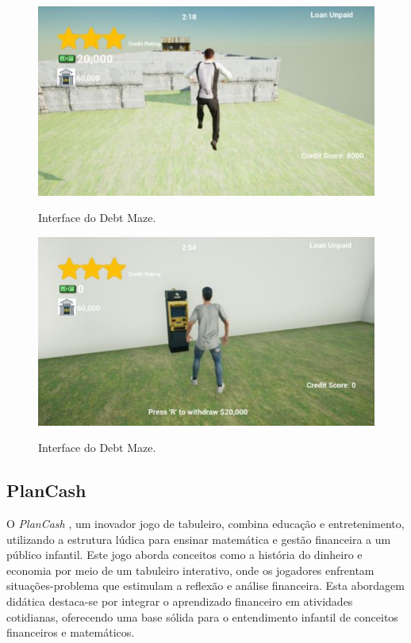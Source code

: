 \begin{figure}[ht]
	\centering
	\caption{Interface do Debt Maze.}
	\includegraphics[scale=0.9]{Textuais/Pictures/debt-maze-1.png}
	\label{fig:debt-maze-1}
\end{figure}

\begin{figure}[ht]
	\centering
	\caption{Interface do Debt Maze.}
	\includegraphics[scale=0.8]{Textuais/Pictures/debt-maze-2.png}
	\label{fig:debt-maze-2}
\end{figure}

\subsection{PlanCash}
O \textit{PlanCash} \cite{mariano2020educaccao}, um inovador jogo de tabuleiro, combina educação e entretenimento, utilizando a estrutura lúdica para ensinar matemática e gestão financeira a um público infantil. Este jogo aborda conceitos como a história do dinheiro e economia por meio de um tabuleiro interativo, onde os jogadores enfrentam situações-problema que estimulam a reflexão e análise financeira. Esta abordagem didática destaca-se por integrar o aprendizado financeiro em atividades cotidianas, oferecendo uma base sólida para o entendimento infantil de conceitos financeiros e matemáticos.


